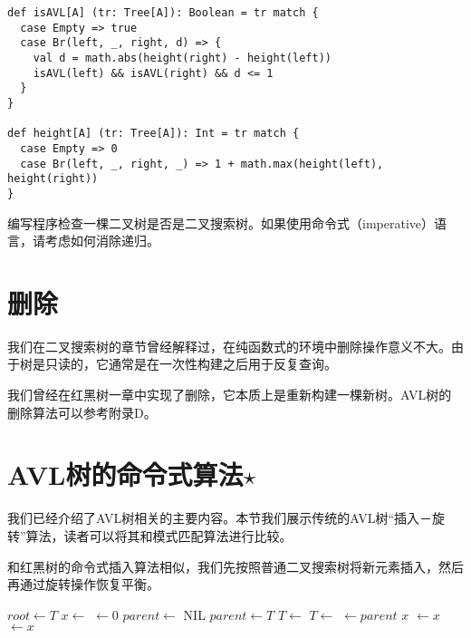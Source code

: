 \documentclass[UTF8]{article}
\begin{document}
\begin{lstlisting}
def isAVL[A] (tr: Tree[A]): Boolean = tr match {
  case Empty => true
  case Br(left, _, right, d) => {
    val d = math.abs(height(right) - height(left))
    isAVL(left) && isAVL(right) && d <= 1
  }
}

def height[A] (tr: Tree[A]): Int = tr match {
  case Empty => 0
  case Br(left, _, right, _) => 1 + math.max(height(left), height(right))
}
\end{lstlisting}

\begin{Exercise}
编写程序检查一棵二叉树是否是二叉搜索树。如果使用命令式（imperative）语言，请考虑如何消除递归。
\end{Exercise}




\section{删除}

我们在二叉搜索树的章节曾经解释过，在纯函数式的环境中删除操作意义不大。由于树是只读的，它通常是在一次性构建之后用于反复查询。

我们曾经在红黑树一章中实现了删除，它本质上是重新构建一棵新树。AVL树的删除算法可以参考附录D。

\section{AVL树的命令式算法$\star$}

我们已经介绍了AVL树相关的主要内容。本节我们展示传统的AVL树“插入－旋转”算法，读者可以将其和模式匹配算法进行比较。

和红黑树的命令式插入算法相似，我们先按照普通二叉搜索树将新元素插入，然后再通过旋转操作恢复平衡。

\begin{algorithmic}[1]
  \State $root \gets T$
  \State $x \gets$ 
  \State {} $\gets 0$
  \State $parent \gets$ NIL
    \State $parent \gets T$
      \State $T \gets $ 
    \Else
      \State $T \gets $ 
    \EndIf
  \EndWhile
  \State {} $\gets parent$
   
    \State \Return $x$
    \State {} $\gets x$
  \Else
    \State {} $\gets x$
  \EndIf
  \State \Return {}
\EndFunction
\end{algorithmic}
\end{document}
